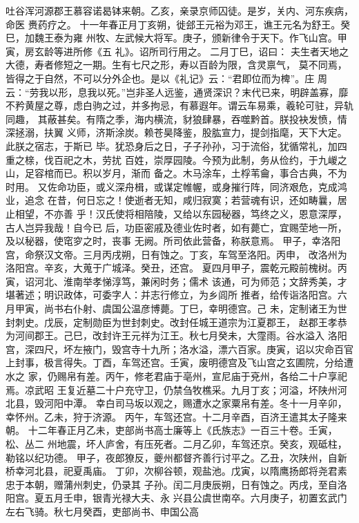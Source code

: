 \documentclass[12pt,UTF8]{ctexbook}
\begin{document}
吐谷浑河源郡王慕容诺曷钵来朝。乙亥，亲录京师囚徒。是岁，关内、河东疾病，命医
赉药疗之。
十一年春正月丁亥朔，徙郐王元裕为邓王，谯王元名为舒王。癸巳，加魏王泰为雍
州牧、左武候大将军。庚子，颁新律令于天下。作飞山宫。甲寅，房玄龄等进所修《五
礼》。诏所司行用之。
二月丁巳，诏曰：
夫生者天地之大德，寿者修短之一期。生有七尺之形，寿以百龄为限，含灵禀气，
莫不同焉，皆得之于自然，不可以分外企也。是以《礼记》云：“君即位而为椑”。庄
周云：“劳我以形，息我以死。”岂非圣人远鉴，通贤深识？末代已来，明辟盖寡，靡
不矜黄屋之尊，虑白驹之过，并多拘忌，有慕遐年。谓云车易乘，羲轮可驻，异轨同趣，
其蔽甚矣。有隋之季，海内横流，豺狼肆暴，吞噬黔首。朕投袂发愤，情深拯溺，扶翼
义师，济斯涂炭。赖苍昊降鉴，股肱宣力，提剑指麾，天下大定。此朕之宿志，于斯已
毕。犹恐身后之日，子子孙孙，习于流俗，犹循常礼，加四重之榇，伐百祀之木，劳扰
百姓，崇厚园陵。今预为此制，务从俭约，于九嵕之山，足容棺而已。积以岁月，渐而
备之。木马涂车，土桴苇龠，事合古典，不为时用。
又佐命功臣，或义深舟楫，或谋定帷幄，或身摧行阵，同济艰危，克成鸿业，追念
在昔，何日忘之！使逝者无知，咸归寂寞；若营魂有识，还如畴曩，居止相望，不亦善
乎！汉氏使将相陪陵，又给以东园秘器，笃终之义，恩意深厚，古人岂异我哉！自今已
后，功臣密戚及德业佐时者，如有薨亡，宜赐茔地一所，及以秘器，使窀穸之时，丧事
无阙。所司依此营备，称朕意焉。
甲子，幸洛阳宫，命祭汉文帝。三月丙戌朔，日有蚀之。丁亥，车驾至洛阳。丙申，
改洛州为洛阳宫。辛亥，大蒐于广城泽。癸丑，还宫。
夏四月甲子，震乾元殿前槐树。丙寅，诏河北、淮南举孝悌淳笃，兼闲时务；儒术
该通，可为师范；文辞秀美，才堪著述；明识政体，可委字人：并志行修立，为乡闾所
推者，给传诣洛阳宫。六月甲寅，尚书右仆射、虞国公温彦博薨。丁巳，幸明德宫。己
未，定制诸王为世封刺史。戊辰，定制勋臣为世封刺史。改封任城王道宗为江夏郡王，
赵郡王孝恭为河间郡王。己巳，改封许王元祥为江王。秋七月癸未，大霪雨。谷水溢入
洛阳宫，深四尺，坏左掖门，毁宫寺十九所；洛水溢，漂六百家。庚寅，诏以灾命百官
上封事，极言得失。丁酉，车驾还宫。壬寅，废明德宫及飞山宫之玄圃院，分给遭水之
家，仍赐帛有差。丙午，修老君庙于亳州，宣尼庙于兗州，各给二十户享祀焉。凉武昭
王复近墓二十户充守卫，仍禁刍牧樵采。九月丁亥；河溢，坏陕州河北县，毁河阳中潭。
幸白司马坂以观之，赐遭水之家粟帛有差。冬十一月辛卯，幸怀州。乙未，狩于济源。
丙午，车驾还宫。十二月辛酉，百济王遣其太子隆来朝。
十二年春正月乙未，吏部尚书高士廉等上《氏族志》一百三十卷。壬寅，松、丛二
州地震，坏人庐舍，有压死者。二月乙卯，车驾还京。癸亥，观砥柱，勒铭以纪功德。
甲子，夜郎獠反，夔州都督齐善行讨平之。乙丑，次陕州，自新桥幸河北县，祀夏禹庙。
丁卯，次柳谷顿，观盐池。戊寅，以隋鹰扬郎将尧君素忠于本朝，赠蒲州刺史，仍录其
子孙。闰二月庚辰朔，日有蚀之。丙戌，至自洛阳宫。夏五月壬申，银青光禄大夫、永
兴县公虞世南卒。六月庚子，初置玄武门左右飞骑。秋七月癸酉，吏部尚书、申国公高
\end{document}
